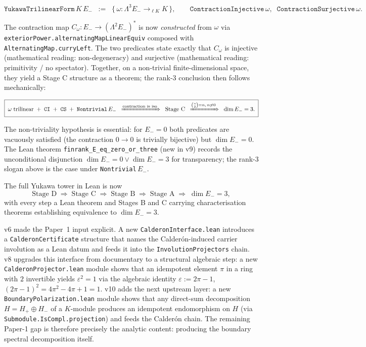 \documentclass[11pt,a4paper]{article}
\begin{document}
\[
\texttt{YukawaTrilinearForm}\,K\,E_-
\;\;:=\;\;
\bigl\{\,\omega : \Lambda^3 E_- \to_{\ell K} K\,\bigr\},
\qquad
\texttt{ContractionInjective}\,\omega,\;\;
\texttt{ContractionSurjective}\,\omega.
\]

The contraction map $C_\omega : E_- \to (\Lambda^2 E_-)^*$ is
now \emph{constructed} from $\omega$ via
\texttt{exteriorPower.alternatingMapLinearEquiv} composed with
\texttt{AlternatingMap.curryLeft}. The two predicates state
exactly that $C_\omega$ is injective (mathematical reading:
non-degeneracy) and surjective (mathematical reading: primitivity
/ no spectator). Together, on a non-trivial finite-dimensional
space, they yield a Stage C structure as a theorem; the rank-3
conclusion then follows mechanically:

\[
\boxed{\;
\omega\;\text{trilinear} \;+\; \texttt{CI} \;+\; \texttt{CS} \;+\; \texttt{Nontrivial}\,E_-
\;\;\xRightarrow{\text{contraction is iso}}\;\;
\text{Stage C}
\;\;\xRightarrow{\binom{n}{2} = n,\, n\ne 0}\;\;
\dim E_- = 3.
\;}
\]

\noindent
The non-triviality hypothesis is essential: for $E_- = 0$ both
predicates are vacuously satisfied (the contraction $0 \to 0$ is
trivially bijective) but $\dim E_- = 0$. The Lean theorem
\texttt{finrank\_E\_eq\_zero\_or\_three} (new in v9) records the
unconditional disjunction $\dim E_- = 0 \lor \dim E_- = 3$ for
transparency; the rank-3 slogan above is the case under
\texttt{Nontrivial}\,$E_-$.

The full Yukawa tower in Lean is now
\[
\text{Stage D}
\;\Rightarrow\; \text{Stage C}
\;\Rightarrow\; \text{Stage B}
\;\Rightarrow\; \text{Stage A}
\;\Rightarrow\; \dim E_- = 3,
\]
with every step a Lean theorem and Stages B and C carrying
characterisation theorems establishing equivalence to
$\dim E_- = 3$.

v6 made the Paper~1 input explicit. A new
\texttt{CalderonInterface.lean} introduces a
\texttt{CalderonCertificate} structure that names the
Calder\'on-induced carrier involution as a Lean datum and feeds
it into the \texttt{InvolutionProjectors} chain. v8 upgrades
this interface from documentary to a structural algebraic step:
a new \texttt{CalderonProjector.lean} module shows that an
idempotent element $\pi$ in a ring with $2$ invertible yields
$\varepsilon^2 = 1$ via the algebraic identity $\varepsilon := 2\pi - 1$,
$(2\pi - 1)^2 = 4\pi^2 - 4\pi + 1 = 1$. v10 adds the next
upstream layer: a new \texttt{BoundaryPolarization.lean} module
shows that any direct-sum decomposition $H = H_+ \oplus H_-$
of a $K$-module produces an idempotent endomorphism on $H$ (via
\texttt{Submodule.IsCompl.projection}) and feeds the Calder\'on
chain. The remaining Paper-1 gap is therefore precisely the
analytic content: producing the boundary spectral
decomposition itself.
\end{document}

